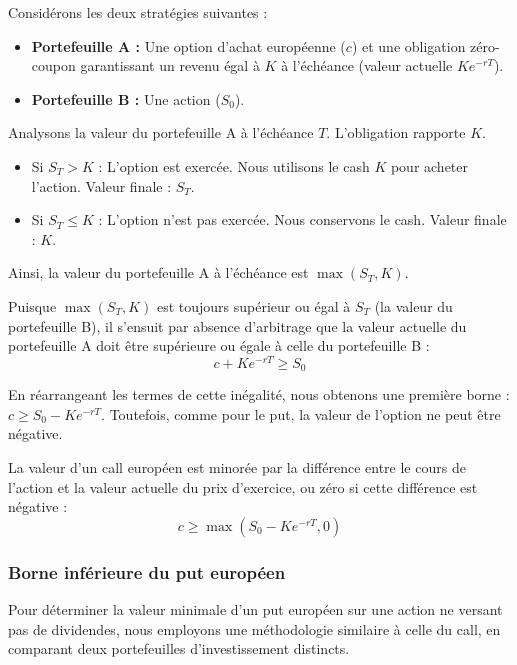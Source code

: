 \begin{proofbox}
Considérons les deux stratégies suivantes :
\begin{itemize}
    \item \textbf{Portefeuille A :} Une option d'achat européenne ($c$) et une obligation zéro-coupon garantissant un revenu égal à $K$ à l'échéance (valeur actuelle $Ke^{-rT}$).
    \item \textbf{Portefeuille B :} Une action ($S_0$).
\end{itemize}

Analysons la valeur du portefeuille A à l'échéance $T$. L'obligation rapporte $K$.
\begin{itemize}
    \item Si $S_T > K$ : L'option est exercée. Nous utilisons le cash $K$ pour acheter l'action. Valeur finale : $S_T$.
    \item Si $S_T \le K$ : L'option n'est pas exercée. Nous conservons le cash. Valeur finale : $K$.
\end{itemize}
Ainsi, la valeur du portefeuille A à l'échéance est $\max(S_T, K)$.

Puisque $\max(S_T, K)$ est toujours supérieur ou égal à $S_T$ (la valeur du portefeuille B), il s'ensuit par absence d'arbitrage que la valeur actuelle du portefeuille A doit être supérieure ou égale à celle du portefeuille B :
$$ c + Ke^{-rT} \ge S_0 $$
\end{proofbox}

En réarrangeant les termes de cette inégalité, nous obtenons une première borne : $c \ge S_0 - Ke^{-rT}$. Toutefois, comme pour le put, la valeur de l'option ne peut être négative.

\begin{theorembox}
La valeur d'un call européen est minorée par la différence entre le cours de l'action et la valeur actuelle du prix d'exercice, ou zéro si cette différence est négative :
$$ c \ge \max(S_0 - Ke^{-rT}, 0) $$
\end{theorembox}

\subsubsection{Borne inférieure du put européen}

Pour déterminer la valeur minimale d'un put européen sur une action ne versant pas de dividendes, nous employons une méthodologie similaire à celle du call, en comparant deux portefeuilles d'investissement distincts.

